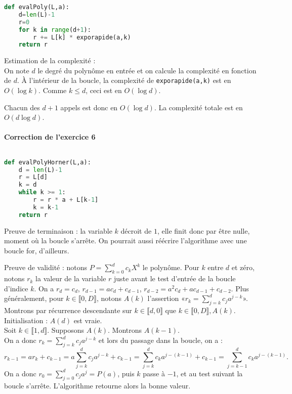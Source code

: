 \documentclass[11pt,a4paper]{article}
\begin{document}
\begin{lstlisting}[language=Python]
def evalPoly(L,a):
	d=len(L)-1
	r=0
	for k in range(d+1):
		r += L[k] * exporapide(a,k)
	return r
\end{lstlisting}

Estimation de la complexité :\\
On note $d$ le degré du polynôme en entrée et on calcule la complexité en fonction de $d$.
À l'intérieur de la boucle, la complexité de \verb+exporapide(a,k)+ est en $O(\log k)$. Comme $k\leq d$, ceci est en $O(\log d)$.

Chacun des $d+1$ appels est donc en $O(\log d)$. 
La complexité totale est en $O(d\log d)$.

\paragraph{Correction de l'exercice 6}$ $
\begin{lstlisting}[language=Python]
def evalPolyHorner(L,a):
	d = len(L)-1
	r = L[d]
	k = d
	while k >= 1:
		r = r * a + L[k-1]
		k = k-1
	return r
\end{lstlisting}

Preuve de terminaison : la variable $k$ décroit de $1$, elle finit donc par être nulle, moment où la boucle s'arrête. On pourrait aussi réécrire l'algorithme avec une boucle \og for\fg, d'ailleurs.

Preuve de validité : notons $P = \sum_{k=0}^d c_kX^k$ le polynôme.
Pour $k$ entre $d$ et zéro, notons $r_k$ la valeur de la variable $r$ juste avant le test d'entrée de la boucle d'indice $k$. 
On a $r_d = c_d$, $r_{d-1} = ac_d+c_{d-1}$, $r_{d-2} = a^2c_d + ac_{d-1}+c_{d-2}$.
Plus généralement, pour $k \in \llbracket 0,D\rrbracket$, notons $A(k)$ l'assertion «$r_k = \sum_{j=k}^{d}c_ja^{j-k}$».
Montrons par récurrence descendante sur $k \in \llbracket d,0\rrbracket$ que $k \in \llbracket 0,D\rrbracket, A(k)$.\\
Initialisation : $A(d)$ est vraie.\\
Soit $k \in \llbracket 1,d\rrbracket$. Supposons $A(k)$. Montrons $A(k-1)$.\\ 
On a donc $r_k = \sum_{j=k}^{d}c_ja^{j-k}$ et lors du passage dans la boucle, on a :
\[
r_{k-1} = ar_k+c_{k-1} 
= a\sum_{j=k}^{d}c_ja^{j-k} + c_{k-1} 
= \sum_{j=k}^{d}c_ka^{j-(k-1)} + c_{k-1}
 = \sum_{j=k-1}^{d}c_ka^{j-(k-1)}.
\]
On a donc $r_0 = \sum_{j=0}^{d}c_ja^{j} = P(a)$, puis $k$ passe à $-1$, et au test suivant la boucle s'arrête.  L'algorithme retourne alors la bonne valeur.
\end{document}
